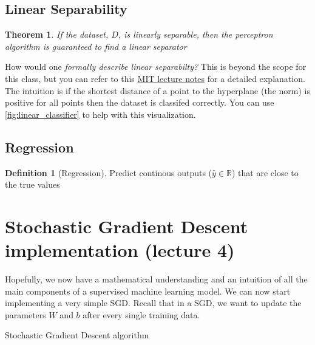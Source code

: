 \documentclass[11pt]{article}
\numberwithin{equation}{section}
\theoremstyle{definition}%
\newtheorem{theorem}{Theorem}
\newtheorem{definition}{Definition}[section]%
\begin{document}

\subsection{Linear Separability}


\begin{theorem}
    \emph{If the dataset, $D$, is linearly separable, then the perceptron algorithm is guaranteed to find a linear separator} \cite{MIT}
\end{theorem}

How would one \emph{formally describe linear separabilty?} This is beyond the scope for this class, but you can refer to this \href{https://openlearninglibrary.mit.edu/assets/courseware/v1/8f4f9aca5581dde50291b0d0e29d0148/asset-v1:MITx+6.036+1T2019+type@asset+block/notes_chapter_The_Perceptron.pdf}{MIT lecture notes} for a detailed explanation. The intuition is if the shortest distance of a point to the hyperplane (the norm) is positive for all points then the dataset is classifed correctly. You can use \autoref{fig:linear_classifier} to help with this visualization.

\subsection{Regression}

\begin{definition}[Regression]
    Predict continous outputs ($\hat{y} \in \mathbb{R}$) that are close to the true values
\end{definition}

\section{Stochastic Gradient Descent implementation (lecture 4)}

Hopefully, we now have a mathematical understanding and an intuition of all the main components of a supervised machine learning model. We can now start implementing a very simple SGD. Recall that in a SGD, we want to update the parameters $W$ and $b$ after every single training data. 

\begin{algorithm}
    \caption{Stochastic Gradient Descent algorithm}
    \begin{algorithmic}[1]
         
             
                 
                 
                 
                 
            \EndFor
        \EndFor
    \end{algorithmic}
\end{algorithm}
\end{document}
